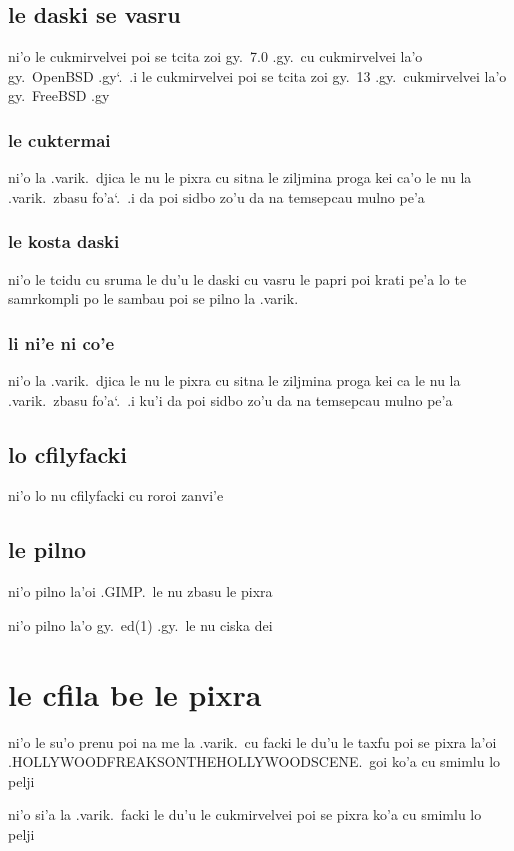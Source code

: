 \documentclass{report}
\newcommand\sds{\spacefactor\sfcode`.\ \space}
\begin{document}
\subsection{le daski se vasru}
ni'o le cukmirvelvei poi se tcita zoi gy.\ 7.0 .gy.\ cu cukmirvelvei la'o gy.\ OpenBSD .gy\sds  .i le cukmirvelvei poi se tcita zoi gy.\ 13 .gy.\ cukmirvelvei la'o gy.\ FreeBSD .gy

\subsubsection{le cuktermai}
ni'o la .varik.\ djica le nu le pixra cu sitna le ziljmina proga kei ca'o le nu la .varik.\ zbasu fo'a\sds  .i da poi sidbo zo'u da na temsepcau mulno pe'a

\subsubsection{le kosta daski}
ni'o le tcidu cu sruma le du'u le daski cu vasru le papri poi krati pe'a lo te samrkompli po le sambau poi se pilno la .varik.

\subsubsection{li ni'e ni co'e}
ni'o la .varik.\ djica le nu le pixra cu sitna le ziljmina proga kei ca le nu la .varik.\ zbasu fo'a\sds  .i ku'i da poi sidbo zo'u da na temsepcau mulno pe'a

\subsection{lo cfilyfacki}
ni'o lo nu cfilyfacki cu roroi zanvi'e

\subsection{le pilno}
ni'o pilno la'oi .GIMP.\ le nu zbasu le pixra

ni'o pilno la'o gy.\ ed(1) .gy.\ le nu ciska dei

\section{le cfila be le pixra}
ni'o le su'o prenu poi na me la .varik.\ cu facki le du'u le taxfu poi se pixra la'oi .HOLLYWOODFREAKSONTHEHOLLYWOODSCENE.\ goi ko'a cu smimlu lo pelji

ni'o si'a la .varik.\ facki le du'u le cukmirvelvei poi se pixra ko'a cu smimlu lo pelji
\end{document}
